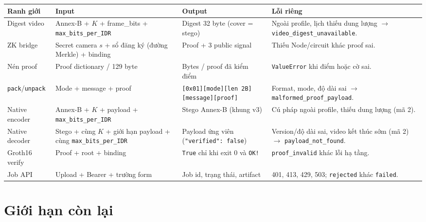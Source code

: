 \documentclass[10pt,a4paper]{article}
\begin{document}
\begin{longtable}{@{}p{.13\linewidth}p{.24\linewidth}p{.25\linewidth}p{.30\linewidth}@{}}
\toprule
\textbf{Ranh giới} & \textbf{Input} & \textbf{Output} & \textbf{Lỗi riêng}\tabularnewline
\midrule\endhead
Digest video & Annex-B + $K$ + frame\_bits + \texttt{max\_bits\_per\_IDR} & Digest 32 byte (cover = stego) & Ngoài profile, lịch thiếu dung lượng $\rightarrow$ \texttt{video\_digest\_unavailable}.\\
ZK bridge & Secret camera $s$ + sổ đăng ký (đường Merkle) + binding & Proof + 3 public signal & Thiếu Node/circuit khác proof sai.\\
Nén proof & Proof dictionary / 129 byte & Bytes / proof đã kiểm điểm & \texttt{ValueError} khi điểm hoặc cờ sai.\\
\texttt{pack}/\texttt{unpack} & Mode + message + proof & \texttt{[0x01][mode][len 2B]} \texttt{[message][proof]} & Format, mode, độ dài sai $\rightarrow$ \texttt{malformed\_proof\_payload}.\\
Native encoder & Annex-B + $K$ + payload + \texttt{max\_bits\_per\_IDR} & Stego Annex-B (khung v3) & Cú pháp ngoài profile, thiếu dung lượng (mã 2).\\
Native decoder & Stego + cùng $K$ + giới hạn payload + cùng \texttt{max\_bits\_per\_IDR} & Payload ứng viên (\texttt{"verified": false}) & Version/độ dài sai, video kết thúc sớm (mã 2) $\rightarrow$ \texttt{payload\_not\_found}.\\
Groth16 verify & Proof + root + binding & \texttt{True} chỉ khi exit 0 và \texttt{OK!} & \texttt{proof\_invalid} khác lỗi hạ tầng.\\
Job API & Upload + Bearer + trường form & Job id, trạng thái, artifact & 401, 413, 429, 503; \texttt{rejected} khác \texttt{failed}.\\
\bottomrule
\end{longtable}

\section{Giới hạn còn lại}\label{sec:limits}
\end{document}
